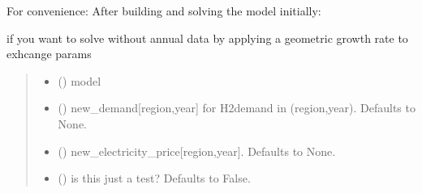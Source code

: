 \documentclass[letterpaper,10pt,english]{sphinxmanual}
\begin{document}
\begin{fulllineitems}
\label{\detokenize{src.models.hydrogen.model.h2_model:src.models.hydrogen.model.h2_model.resolve}}
\pysigstartsignatures
\pysiglinewithargsret
{}
{\sphinxparamcomma {}\sphinxparamcomma {}\sphinxparamcomma {}}
{}
\pysigstopsignatures
\sphinxAtStartPar
For convenience: After building and solving the model initially:

\sphinxAtStartPar
if you want to solve without annual data by applying a geometric growth rate to exhcange params
\begin{quote}\begin{description}
\begin{itemize}
\item {} 
\sphinxAtStartPar
{} ({\hyperref[\detokenize{src.models.hydrogen.model.h2_model:src.models.hydrogen.model.h2_model.H2Model}]{}}) \textendash{} model

\item {} 
\sphinxAtStartPar
{} (\sphinxstyleliteralemphasis{\sphinxupquote{, }}) \textendash{} new\_demand{[}region,year{]} for H2demand in (region,year). Defaults to None.

\item {} 
\sphinxAtStartPar
{} (\sphinxstyleliteralemphasis{\sphinxupquote{, }}) \textendash{} new\_electricity\_price{[}region,year{]}. Defaults to None.

\item {} 
\sphinxAtStartPar
{} (\sphinxstyleliteralemphasis{\sphinxupquote{, }}) \textendash{} is this just a test? Defaults to False.

\end{itemize}

\end{description}\end{quote}

\end{fulllineitems}
\end{document}
